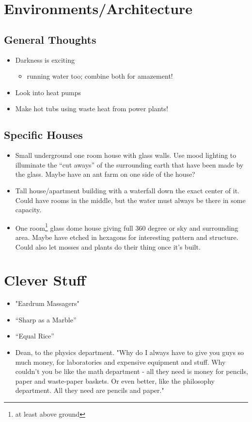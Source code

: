\documentclass{amsart}
\begin{document}
\section{Environments/Architecture}
\subsection{General Thoughts}
\begin{itemize}
\item{Darkness is exciting}
\begin{itemize}
\item{running water too; combine both for amazement!}
\end{itemize}
\item{Look into heat pumps}
\item{Make hot tubs using waste heat from power plants!}
\end{itemize}
\subsection{Specific Houses}
\begin{itemize}
\item{Small underground one room house with glass walls.  Use mood lighting to illuminate the ``cut aways'' of the surrounding earth that have been made by the glass.  Maybe have an ant farm on one side of the house?}
\item{Tall house/apartment building with a waterfall down the exact center of it.  Could have rooms in the middle, but the water must always be there in some capacity.}
\item{One room\footnote{at least above ground} glass dome house giving full 360 degree or sky and surrounding area.  Maybe have etched in hexagons for interesting pattern and structure.  Could also let mosses and plants do their thing once it's built. }
\end{itemize}

\section{Clever Stuff}
\begin{itemize}
\item{"Eardrum Massagers"}
\item{``Sharp as a Marble''}
\item{``Equal Rice''}
\item{Dean, to the physics department. "Why do I always have to give you guys so much money, for laboratories and expensive equipment and stuff. Why couldn't you be like the math department - all they need is money for pencils, paper and waste-paper baskets. Or even better, like the philosophy department. All they need are pencils and paper." }
\end{itemize}
\end{document}
